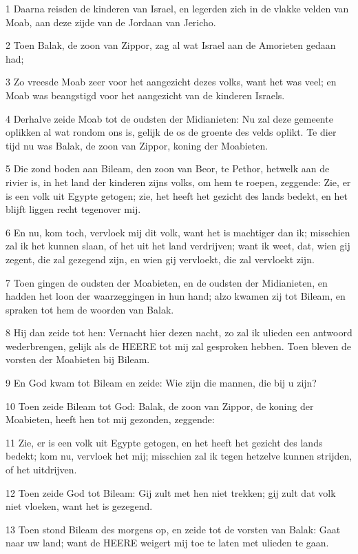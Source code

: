 \par 1 Daarna reisden de kinderen van Israel, en legerden zich in de vlakke velden van Moab, aan deze zijde van de Jordaan van Jericho.
\par 2 Toen Balak, de zoon van Zippor, zag al wat Israel aan de Amorieten gedaan had;
\par 3 Zo vreesde Moab zeer voor het aangezicht dezes volks, want het was veel; en Moab was beangstigd voor het aangezicht van de kinderen Israels.
\par 4 Derhalve zeide Moab tot de oudsten der Midianieten: Nu zal deze gemeente oplikken al wat rondom ons is, gelijk de os de groente des velds oplikt. Te dier tijd nu was Balak, de zoon van Zippor, koning der Moabieten.
\par 5 Die zond boden aan Bileam, den zoon van Beor, te Pethor, hetwelk aan de rivier is, in het land der kinderen zijns volks, om hem te roepen, zeggende: Zie, er is een volk uit Egypte getogen; zie, het heeft het gezicht des lands bedekt, en het blijft liggen recht tegenover mij.
\par 6 En nu, kom toch, vervloek mij dit volk, want het is machtiger dan ik; misschien zal ik het kunnen slaan, of het uit het land verdrijven; want ik weet, dat, wien gij zegent, die zal gezegend zijn, en wien gij vervloekt, die zal vervloekt zijn.
\par 7 Toen gingen de oudsten der Moabieten, en de oudsten der Midianieten, en hadden het loon der waarzeggingen in hun hand; alzo kwamen zij tot Bileam, en spraken tot hem de woorden van Balak.
\par 8 Hij dan zeide tot hen: Vernacht hier dezen nacht, zo zal ik ulieden een antwoord wederbrengen, gelijk als de HEERE tot mij zal gesproken hebben. Toen bleven de vorsten der Moabieten bij Bileam.
\par 9 En God kwam tot Bileam en zeide: Wie zijn die mannen, die bij u zijn?
\par 10 Toen zeide Bileam tot God: Balak, de zoon van Zippor, de koning der Moabieten, heeft hen tot mij gezonden, zeggende:
\par 11 Zie, er is een volk uit Egypte getogen, en het heeft het gezicht des lands bedekt; kom nu, vervloek het mij; misschien zal ik tegen hetzelve kunnen strijden, of het uitdrijven.
\par 12 Toen zeide God tot Bileam: Gij zult met hen niet trekken; gij zult dat volk niet vloeken, want het is gezegend.
\par 13 Toen stond Bileam des morgens op, en zeide tot de vorsten van Balak: Gaat naar uw land; want de HEERE weigert mij toe te laten met ulieden te gaan.
